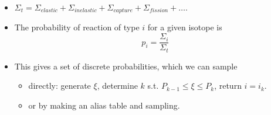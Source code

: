 \documentclass[12pt]{article}
\begin{document}
\begin{itemize}
\item $\Sigma_t = \Sigma_{elastic} + \Sigma_{inelastic} + \Sigma_{capture} + \Sigma_{fission} + \dots$.

\item The probability of reaction of type $i$ for a given isotope is 
\[p_i = \frac{\Sigma_i}{\Sigma_t}\]

\item This gives a set of discrete probabilities, which we can sample 
\begin{itemize}
\item directly: generate $\xi$, determine $k$ s.t. $P_{k-1} \leq \xi \le P_k$, return $i = i_k$.

\item or by making an alias table and sampling.
\end{itemize}

\end{itemize}


%
%
%
%
\end{document}
